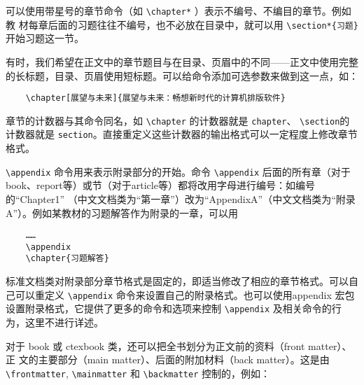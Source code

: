 可以使用带星号的章节命令（如 \verb|\chapter*| ）表示不编号、不编目的章节。例如教
材每章后面的习题往往不编号，也不必放在目录中，就可以用 \verb|\section*{习题}| 开始习题这一节。
    
有时，我们希望在正文中的章节题目与在目录、页眉中的不同——正文中使用完整的长标题，目录、页眉使用短标题。可以给命令添加可选参数来做到这一点，如：
\begin{lstlisting}
    \chapter[展望与未来]{展望与未来：畅想新时代的计算机排版软件}
\end{lstlisting}

章节的计数器与其命令同名，如 \verb|\chapter| 的计数器就是 \verb|chapter|、 \verb|\section|的计数器就是 \verb|section|。直接重定义这些计数器的输出格式可以一定程度上修改章节格式。

\verb|\appendix| 命令用来表示附录部分的开始。命令 \verb|\appendix| 后面的所有章（对于
book、report等）或节（对于article等）都将改用字母进行编号：如编号的“Chapter1”
（中文文档类为“第一章”）改为“AppendixA”（中文文档类为“附录A”）。例如某教材的习题解答作为附录的一章，可以用

\begin{lstlisting}
    ……
    \appendix
    \chapter{习题解答}
\end{lstlisting}

标准文档类对附录部分章节格式是固定的，即适当修改了相应的章节格式。可以自己可以重定义 \verb|\appendix| 命令来设置自己的附录格式。也可以使用appendix 宏包设置附录格式，它提供了更多的命令和选项来控制 \verb|\appendix| 及相关命令的行为，这里不进行详述。

对于 book 或 ctexbook 类，还可以把全书划分为正文前的资料（front matter）、正
文的主要部分（main matter）、后面的附加材料（back matter）。这是由 \verb|\frontmatter|,
\verb|\mainmatter| 和 \verb|\backmatter| 控制的，例如：

